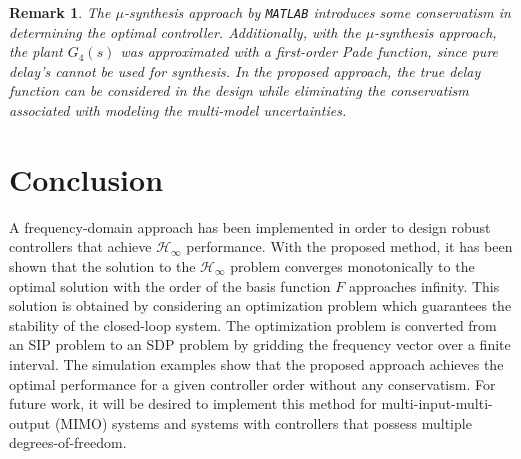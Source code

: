\documentclass[letterpaper, 10 pt, conference]{ieeeconf}  %
\newtheorem*{remark*}{Remark}
\begin{document}
\begin{remark*}
The $\mu$-synthesis approach by \texttt{MATLAB} introduces some conservatism in determining the optimal controller. Additionally, with the $\mu$-synthesis approach, the plant $G_4(s)$ was approximated with a first-order Pade function, since pure delay's cannot be used for synthesis. In the proposed approach, the true delay function can be considered in the design while eliminating the conservatism associated with modeling the multi-model uncertainties. 
\end{remark*}


\section{Conclusion} \label{sec:conclusion}
A frequency-domain approach has been implemented in order to design robust controllers that achieve $\mathcal{H}_{\infty}$ performance. With the proposed method, it has been shown that the solution to the $\mathcal{H}_{\infty}$ problem converges monotonically to the optimal solution with the order of the basis function $F$ approaches infinity. This solution is obtained by considering an optimization problem which guarantees the stability of the closed-loop system. The optimization problem is converted from an SIP problem to an SDP problem by gridding the frequency vector over a finite interval. The simulation examples show that the proposed approach achieves the optimal performance for a given controller order without any conservatism. For future work, it will be desired to implement this method for multi-input-multi-output (MIMO) systems and systems with controllers that possess multiple degrees-of-freedom.  


\end{document}
